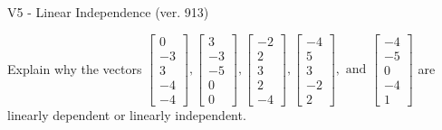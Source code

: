 \begin{exercise}
  \begin{exerciseTitle}V5 - Linear Independence (ver. 913)\end{exerciseTitle}
  \begin{exerciseStatement}
    Explain why the vectors \(\left[\begin{array}{r}
0 \\
-3 \\
3 \\
-4 \\
-4
\end{array}\right] , \left[\begin{array}{r}
3 \\
-3 \\
-5 \\
0 \\
0
\end{array}\right] , \left[\begin{array}{r}
-2 \\
2 \\
3 \\
2 \\
-4
\end{array}\right] , \left[\begin{array}{r}
-4 \\
5 \\
3 \\
-2 \\
2
\end{array}\right] , \text{ and } \left[\begin{array}{r}
-4 \\
-5 \\
0 \\
-4 \\
1
\end{array}\right]\) are linearly dependent or linearly independent.	



\end{exerciseStatement}
\end{exercise}
